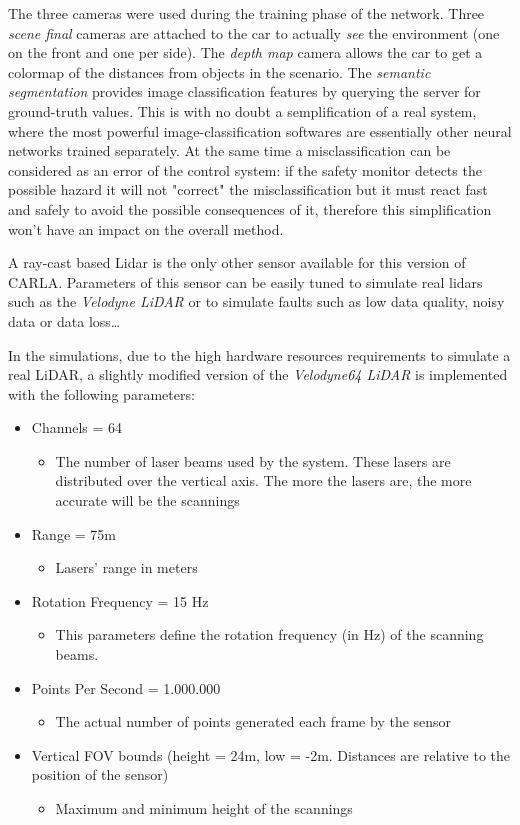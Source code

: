 The three cameras were used during the training phase of the network. Three \textsl{scene final} cameras are attached to the car to actually \textsl{see} the environment (one on the front and one per side). The \textsl{depth map} camera allows the car to get a colormap of the distances from objects in the scenario.
The \textsl{semantic segmentation} provides image classification features by querying the server for ground-truth values. This is with no doubt a semplification of a real system, where the most powerful image-classification softwares are essentially other neural networks trained separately. At the same time a misclassification can be considered as an error of the control system: if the safety monitor detects the possible hazard it will not "correct" the misclassification but it must react fast and safely to avoid the possible consequences of it, therefore this simplification won't have an impact on the overall method.\newline

A ray-cast based Lidar is the only other sensor available for this version of CARLA. Parameters of this sensor can be easily tuned to simulate real lidars such as the \textsl{Velodyne LiDAR} or to simulate faults such as low data quality, noisy data or data loss\dots

In the simulations, due to the high hardware resources requirements to simulate a real LiDAR, a slightly modified version of the \textsl{Velodyne64 LiDAR} is implemented with the following parameters:

\begin{itemize}
	\item Channels = 64
	\begin{itemize}
		\item The number of laser beams used by the system. These lasers are distributed over the vertical axis. The more the lasers are, the more accurate will be the scannings
	\end{itemize}
	\item Range = 75m
	\begin{itemize}
		\item Lasers' range in meters
	\end{itemize}
	\item Rotation Frequency = 15 Hz
	\begin{itemize}
		\item This parameters define the rotation frequency (in Hz) of the scanning beams.
	\end{itemize}
	\item Points Per Second = 1.000.000
	\begin{itemize}
		\item The actual number of points generated each frame by the sensor
	\end{itemize}
	\item Vertical FOV bounds (height = 24m, low = -2m. Distances are relative to the position of the sensor)
	\begin{itemize}
		\item Maximum and minimum height of the scannings
	\end{itemize}
\end{itemize}

